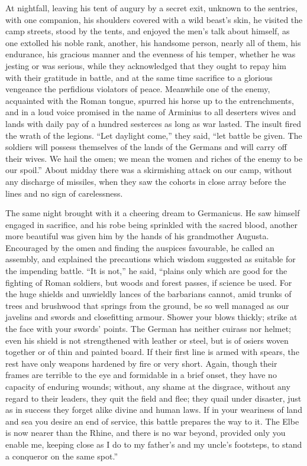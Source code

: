 At nightfall, leaving his tent of augury by a secret exit, unknown to the sentries, with one companion, his shoulders covered with a wild beast's skin, he visited the camp streets, stood by the tents, and enjoyed the men's talk about himself, as one extolled his noble rank, another, his handsome person, nearly all of them, his endurance, his gracious manner and the evenness of his temper, whether he was jesting or was serious, while they acknowledged that they ought to repay him with their gratitude in battle, and at the same time sacrifice to a glorious vengeance the perfidious violators of peace. Meanwhile one of the enemy, acquainted with the Roman tongue, spurred his horse up to the entrenchments, and in a loud voice promised in the name of Arminius to all deserters wives and lands with daily pay of a hundred sesterces as long as war lasted. The insult fired the wrath of the legions. ``Let daylight come,'' they said, ``let battle be given. The soldiers will possess themselves of the lands of the Germans and will carry off their wives. We hail the omen; we mean the women and riches of the enemy to be our spoil.'' About midday there was a skirmishing attack on our camp, without any discharge of missiles, when they saw the cohorts in close array before the lines and no sign of carelessness.


The same night brought with it a cheering dream to Germanicus. He saw himself engaged in sacrifice, and his robe being sprinkled with the sacred blood, another more beautiful was given him by the hands of his grandmother Augusta. Encouraged by the omen and finding the auspices favourable, he called an assembly, and explained the precautions which wisdom suggested as suitable for the impending battle. ``It is not,'' he said, ``plains only which are good for the fighting of Roman soldiers, but woods and forest passes, if science be used. For the huge shields and unwieldly lances of the barbarians cannot, amid trunks of trees and brushwood that springs from the ground, be so well managed as our javelins and swords and closefitting armour. Shower your blows thickly; strike at the face with your swords' points. The German has neither cuirass nor helmet; even his shield is not strengthened with leather or steel, but is of osiers woven together or of thin and painted board. If their first line is armed with spears, the rest have only weapons hardened by fire or very short. Again, though their frames are terrible to the eye and formidable in a brief onset, they have no capacity of enduring wounds; without, any shame at the disgrace, without any regard to their leaders, they quit the field and flee; they quail under disaster, just as in success they forget alike divine and human laws. If in your weariness of land and sea you desire an end of service, this battle prepares the way to it. The Elbe is now nearer than the Rhine, and there is no war beyond, provided only you enable me, keeping close as I do to my father's and my uncle's footsteps, to stand a conqueror on the same spot.''

